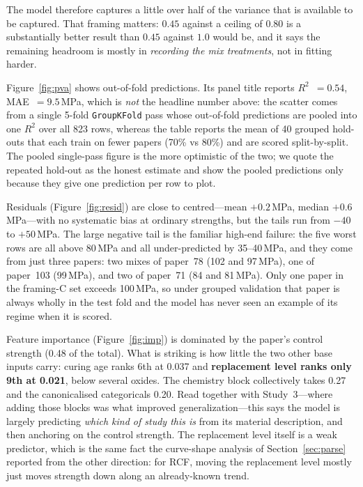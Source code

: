 \documentclass[11pt]{article}
\newcommand{\R}{$R^2$}
\begin{document}
The model therefore captures a little over half of the variance that is available
to be captured. That framing matters: $0.45$ against a ceiling of $0.80$ is a
substantially better result than $0.45$ against $1.0$ would be, and it says the
remaining headroom is mostly in \emph{recording the mix treatments}, not in fitting
harder.

Figure~\ref{fig:pva} shows out-of-fold predictions. Its panel title reports
\R{}~$=0.54$, MAE~$=9.5$\,MPa, which is \emph{not} the headline number above: the
scatter comes from a single 5-fold \texttt{GroupKFold} pass whose out-of-fold
predictions are pooled into one \R{} over all 823 rows, whereas the table reports
the mean of 40 grouped hold-outs that each train on fewer papers (70\% vs 80\%) and
are scored split-by-split. The pooled single-pass figure is the more optimistic of
the two; we quote the repeated hold-out as the honest estimate and show the pooled
predictions only because they give one prediction per row to plot.

Residuals (Figure~\ref{fig:resid}) are close to centred---mean $+0.2$\,MPa, median
$+0.6$\,MPa---with no systematic bias at ordinary strengths, but the tails run from
$-40$ to $+50$\,MPa. The large negative tail is the familiar high-end failure: the
five worst rows are all above 80\,MPa and all under-predicted by 35--40\,MPa, and
they come from just three papers: two mixes of paper~78 (102 and 97\,MPa), one of
paper~103 (99\,MPa), and two of paper~71 (84 and 81\,MPa). Only one paper in the
framing-C set
exceeds 100\,MPa, so under grouped validation that paper is always wholly in the
test fold and the model has never seen an example of its regime when it is scored.

Feature importance (Figure~\ref{fig:imp}) is dominated by the paper's control
strength (0.48 of the total). What is striking is how little the two other base
inputs carry: curing age ranks 6th at 0.037 and \textbf{replacement level ranks only
9th at 0.021}, below several oxides. The chemistry block collectively takes 0.27 and
the canonicalised categoricals 0.20. Read together with Study~3---where adding those
blocks was what improved generalization---this says the model is largely predicting
\emph{which kind of study this is} from its material description, and then
anchoring on the control strength. The replacement level itself is a weak
predictor, which is the same fact the curve-shape analysis of Section~\ref{sec:parse}
reported from the other direction: for RCF, moving the replacement level mostly just
moves strength down along an already-known trend.
\end{document}
